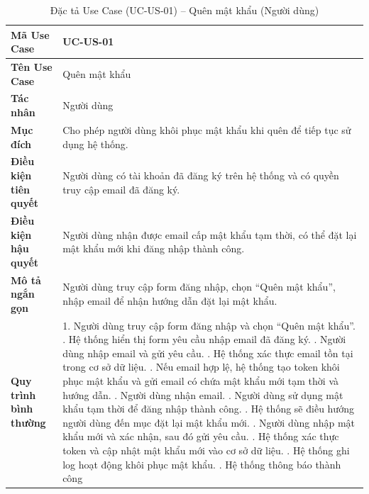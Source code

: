 \renewcommand{\arraystretch}{1.3}
\setlength{\tabcolsep}{4pt}
\begin{longtable}{|p{}|p{}|}
\caption{Đặc tả Use Case (UC-US-01) -- Quên mật khẩu (Người dùng) }\label{tab:uc_forgot_password_user}\\
\hline
\textbf{Mã Use Case} & UC-US-01 \\ \hline
\textbf{Tên Use Case} & Quên mật khẩu \\ \hline
\textbf{Tác nhân} & Người dùng \\ \hline
\textbf{Mục đích} & Cho phép người dùng khôi phục mật khẩu khi quên để tiếp tục sử dụng hệ thống. \\ \hline
\textbf{Điều kiện tiên quyết} & Người dùng có tài khoản đã đăng ký trên hệ thống và có quyền truy cập email đã đăng ký. \\ \hline
\textbf{Điều kiện hậu quyết} & Người dùng nhận được email cấp mật khẩu tạm thời, có thể đặt lại mật khẩu mới khi đăng nhập thành công. \\ \hline
\textbf{Mô tả ngắn gọn} & Người dùng truy cập form đăng nhập, chọn “Quên mật khẩu”, nhập email để nhận hướng dẫn đặt lại mật khẩu. \\ \hline
\textbf{Quy trình bình thường} &
1. Người dùng truy cập form đăng nhập và chọn “Quên mật khẩu”. \newline
2. Hệ thống hiển thị form yêu cầu nhập email đã đăng ký. \newline
3. Người dùng nhập email và gửi yêu cầu. \newline
4. Hệ thống xác thực email tồn tại trong cơ sở dữ liệu. \newline
5. Nếu email hợp lệ, hệ thống tạo token khôi phục mật khẩu và gửi email có chứa mật khẩu mới tạm thời và hướng dẫn. \newline
6. Người dùng nhận email. \newline
7. Người dùng sử dụng mật khẩu tạm thời để đăng nhập thành công. \newline
8. Hệ thống sẽ điều hướng người dùng đến mục đặt lại mật khẩu mới. \newline
9. Người dùng nhập mật khẩu mới và xác nhận, sau đó gửi yêu cầu. \newline
10. Hệ thống xác thực token và cập nhật mật khẩu mới vào cơ sở dữ liệu. \newline
11. Hệ thống ghi log hoạt động khôi phục mật khẩu. \newline
12. Hệ thống thông báo thành công \\ \hline

\end{longtable}
